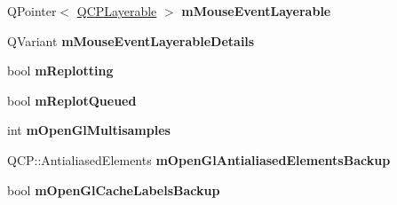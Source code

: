 \begin{DoxyCompactItemize}
\item 
Q\+Pointer$<$ \hyperlink{class_q_c_p_layerable}{Q\+C\+P\+Layerable} $>$ {\bfseries m\+Mouse\+Event\+Layerable}\hypertarget{class_q_custom_plot_a93a81f6dba7ee8ba2d71f346034716cc}{}\label{class_q_custom_plot_a93a81f6dba7ee8ba2d71f346034716cc}

\item 
Q\+Variant {\bfseries m\+Mouse\+Event\+Layerable\+Details}\hypertarget{class_q_custom_plot_ad604958ef16fc022c474521a08d88a2d}{}\label{class_q_custom_plot_ad604958ef16fc022c474521a08d88a2d}

\item 
bool {\bfseries m\+Replotting}\hypertarget{class_q_custom_plot_ab30daeca6612c3948afd368dce5f1c39}{}\label{class_q_custom_plot_ab30daeca6612c3948afd368dce5f1c39}

\item 
bool {\bfseries m\+Replot\+Queued}\hypertarget{class_q_custom_plot_acedeef316dfcde835b8ea0112cec2a77}{}\label{class_q_custom_plot_acedeef316dfcde835b8ea0112cec2a77}

\item 
int {\bfseries m\+Open\+Gl\+Multisamples}\hypertarget{class_q_custom_plot_aacafac2b2280b6a868a4b734273a394c}{}\label{class_q_custom_plot_aacafac2b2280b6a868a4b734273a394c}

\item 
Q\+C\+P\+::\+Antialiased\+Elements {\bfseries m\+Open\+Gl\+Antialiased\+Elements\+Backup}\hypertarget{class_q_custom_plot_adbf005715d5f8550511819a4baf841fb}{}\label{class_q_custom_plot_adbf005715d5f8550511819a4baf841fb}

\item 
bool {\bfseries m\+Open\+Gl\+Cache\+Labels\+Backup}\hypertarget{class_q_custom_plot_ab1692469dde841080fa33719533bf2b7}{}\label{class_q_custom_plot_ab1692469dde841080fa33719533bf2b7}

\end{DoxyCompactItemize}
